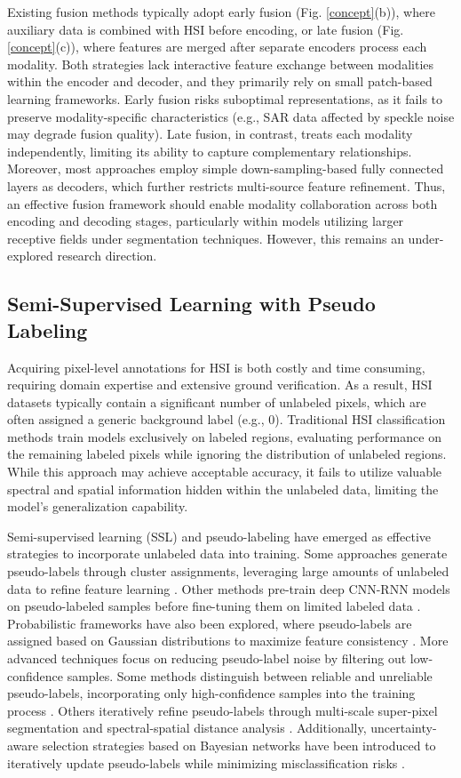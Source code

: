 Existing fusion methods typically adopt early fusion (Fig. \ref{concept}(b)), where auxiliary data is combined with HSI before encoding, or late fusion (Fig. \ref{concept}(c)), where features are merged after separate encoders process each modality. Both strategies lack interactive feature exchange between modalities within the encoder and decoder, and they primarily rely on small patch-based learning frameworks. Early fusion risks suboptimal representations, as it fails to preserve modality-specific characteristics (e.g., SAR data affected by speckle noise may degrade fusion quality). Late fusion, in contrast, treats each modality independently, limiting its ability to capture complementary relationships. Moreover, most approaches employ simple down-sampling-based fully connected layers as decoders, which further restricts multi-source feature refinement. Thus, an effective fusion framework should enable modality collaboration across both encoding and decoding stages, particularly within models utilizing larger receptive fields under segmentation techniques. However, this remains an under-explored research direction.


\subsection{Semi-Supervised Learning with Pseudo Labeling}
Acquiring pixel-level annotations for HSI is both costly and time consuming, requiring domain expertise and extensive ground verification. As a result, HSI datasets typically contain a significant number of unlabeled pixels, which are often assigned a generic background label (e.g., 0). Traditional HSI classification methods train models exclusively on labeled regions, evaluating performance on the remaining labeled pixels while ignoring the distribution of unlabeled regions. While this approach may achieve acceptable accuracy, it fails to utilize valuable spectral and spatial information hidden within the unlabeled data, limiting the model’s generalization capability.

Semi-supervised learning (SSL) and pseudo-labeling have emerged as effective strategies to incorporate unlabeled data into training. Some approaches generate pseudo-labels through cluster assignments, leveraging large amounts of unlabeled data to refine feature learning \cite{pseudo-4}. Other methods pre-train deep CNN-RNN models on pseudo-labeled samples before fine-tuning them on limited labeled data \cite{pseudo-3}. Probabilistic frameworks have also been explored, where pseudo-labels are assigned based on Gaussian distributions to maximize feature consistency \cite{pseudo-1}. More advanced techniques focus on reducing pseudo-label noise by filtering out low-confidence samples. Some methods distinguish between reliable and unreliable pseudo-labels, incorporating only high-confidence samples into the training process \cite{pseudo-5}. Others iteratively refine pseudo-labels through multi-scale super-pixel segmentation and spectral-spatial distance analysis \cite{pseudo-2}. Additionally, uncertainty-aware selection strategies based on Bayesian networks have been introduced to iteratively update pseudo-labels while minimizing misclassification risks \cite{pseudo-6}.

